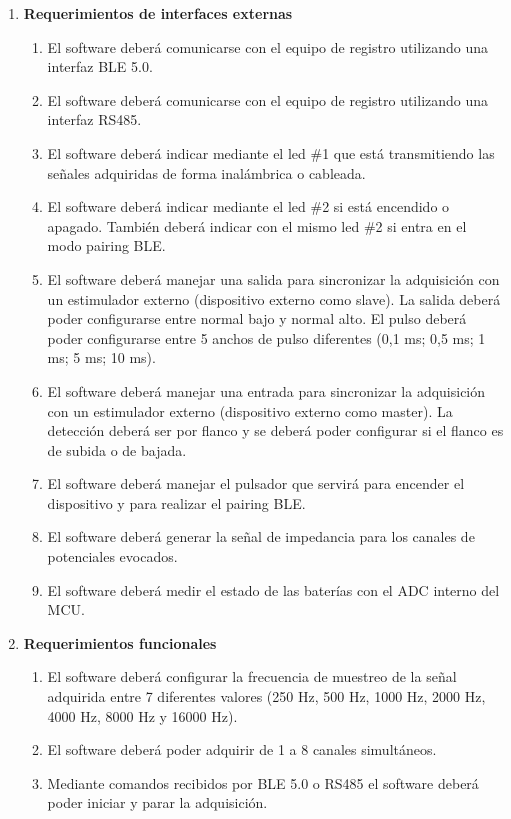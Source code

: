 \begin{enumerate}
	\item \textbf{Requerimientos de interfaces externas}
		\begin{enumerate}
			\item El software deberá comunicarse con el equipo de registro utilizando una interfaz BLE 5.0.
			\item El software deberá comunicarse con el equipo de registro utilizando una interfaz RS485. 
			\item El software deberá indicar mediante el led \#1 que está transmitiendo las señales adquiridas de forma inalámbrica o cableada. 
			\item El software deberá indicar mediante el led \#2 si está encendido o apagado. También deberá indicar con el mismo led \#2 si entra en el modo pairing BLE.
			\item El software deberá manejar una salida para sincronizar la adquisición con un estimulador externo (dispositivo externo como slave). La salida deberá poder configurarse entre normal bajo y normal alto. El pulso deberá poder configurarse entre 5 anchos de pulso diferentes (0,1 ms; 0,5 ms; 1 ms; 5 ms; 10 ms). 
			\item El software deberá manejar una entrada para sincronizar la adquisición con un estimulador externo (dispositivo externo como master). La detección deberá ser por flanco y se deberá poder configurar si el flanco es de subida o de bajada.
			\item El software deberá manejar el pulsador que servirá para encender el dispositivo y para realizar el pairing BLE.
			\item El software deberá generar la señal de impedancia para los canales de potenciales evocados.
			\item El software deberá medir el estado de las baterías con el ADC interno del MCU.
		\end{enumerate}
	\item \textbf{Requerimientos funcionales}
		\begin{enumerate}
			\item El software deberá configurar la frecuencia de muestreo de la señal adquirida entre 7 diferentes valores (250 Hz, 500 Hz, 1000 Hz, 2000 Hz, 4000 Hz, 8000 Hz y 16000 Hz).
			\item El software deberá poder adquirir de 1 a 8 canales simultáneos.
			\item Mediante comandos recibidos por BLE 5.0 o RS485 el software deberá poder iniciar y parar la adquisición.

\end{enumerate}
\end{enumerate}
